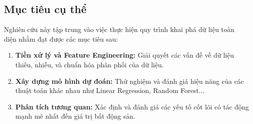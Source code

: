 \subsection{Mục tiêu cụ thể}
Nghiên cứu này tập trung vào việc thực hiện quy trình khai phá dữ liệu toàn diện nhằm đạt được các mục tiêu sau:
\begin{enumerate}
\item \textbf{Tiền xử lý và Feature Engineering:} Giải quyết các vấn đề về dữ liệu thiếu, nhiễu, và chuẩn hóa phân phối của dữ liệu.
\item \textbf{Xây dựng mô hình dự đoán:} Thử nghiệm và đánh giá hiệu năng của các thuật toán khác nhau như Linear Regression, Random Forest...
\item \textbf{Phân tích tương quan:} Xác định và đánh giá các yếu tố cốt lõi có tác động mạnh mẽ nhất đến giá trị bất động sản.
\end{enumerate}
